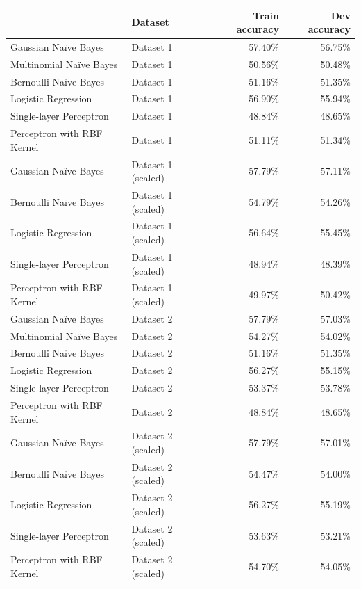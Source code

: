 \documentclass[12pt,twoside,a4paper]{article}
\begin{document}
\begin{center}
\begin{tabular}{llrr}
\toprule
{} & Dataset & Train accuracy & Dev accuracy \\ 
\midrule
Gaussian Naïve Bayes & Dataset 1 & 57.40\% & 56.75\% \\ 
Multinomial Naïve Bayes & Dataset 1 & 50.56\% & 50.48\% \\ 
Bernoulli Naïve Bayes & Dataset 1 & 51.16\% & 51.35\% \\ 
Logistic Regression & Dataset 1 & 56.90\% & 55.94\% \\ 
Single-layer Perceptron & Dataset 1 & 48.84\% & 48.65\% \\ 
Perceptron with RBF Kernel & Dataset 1 & 51.11\% & 51.34\% \\
\midrule
Gaussian Naïve Bayes & Dataset 1 (scaled) & 57.79\% & 57.11\% \\ 
Bernoulli Naïve Bayes & Dataset 1 (scaled) & 54.79\% & 54.26\% \\ 
Logistic Regression & Dataset 1 (scaled) & 56.64\% & 55.45\% \\ 
Single-layer Perceptron & Dataset 1 (scaled) & 48.94\% & 48.39\% \\
Perceptron with RBF Kernel & Dataset 1 (scaled) & 49.97\% & 50.42\% \\ 
\midrule
Gaussian Naïve Bayes & Dataset 2 & 57.79\% & 57.03\% \\ 
Multinomial Naïve Bayes & Dataset 2 & 54.27\% & 54.02\% \\ 
Bernoulli Naïve Bayes & Dataset 2 & 51.16\% & 51.35\% \\ 
Logistic Regression & Dataset 2 & 56.27\% & 55.15\% \\ 
Single-layer Perceptron & Dataset 2 & 53.37\% & 53.78\% \\ 
Perceptron with RBF Kernel & Dataset 2 & 48.84\% & 48.65\% \\ 
\midrule
Gaussian Naïve Bayes & Dataset 2 (scaled) & 57.79\% & 57.01\% \\ 
Bernoulli Naïve Bayes & Dataset 2 (scaled) & 54.47\% & 54.00\% \\ 
Logistic Regression & Dataset 2 (scaled) & 56.27\% & 55.19\% \\ 
Single-layer Perceptron & Dataset 2 (scaled) & 53.63\% & 53.21\% \\ 
Perceptron with RBF Kernel & Dataset 2 (scaled) & 54.70\% & 54.05\% \\ 
\bottomrule
\end{tabular} 
\end{center}
\end{document}
